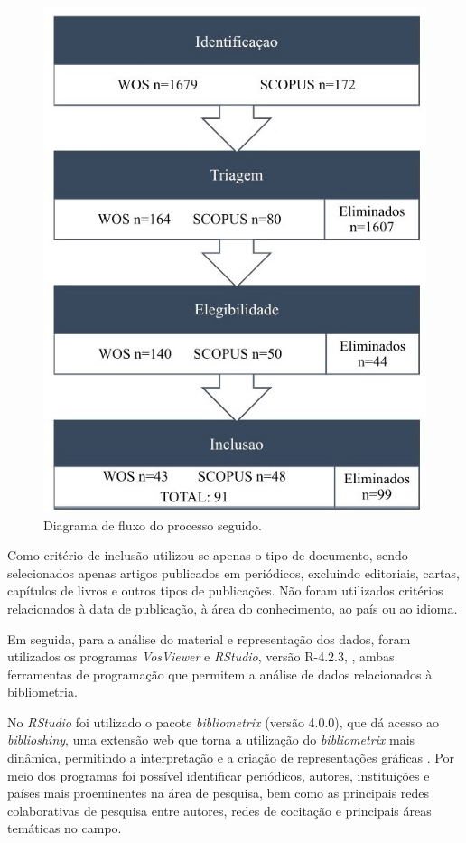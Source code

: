 \documentclass[portuguese]{textolivre}
\begin{document}
\begin{figure}[h!]
    \centering
    \includegraphics[width=0.6\linewidth]{Fig1.jpg}
    \caption{Diagrama de fluxo do processo seguido.}
    \label{fig1}
\end{figure}

Como critério de inclusão utilizou-se apenas o tipo de documento, sendo selecionados apenas artigos publicados em periódicos, excluindo editoriais, cartas, capítulos de livros e outros tipos de publicações. Não foram utilizados critérios relacionados à data de publicação, à área do conhecimento, ao país ou ao idioma.

Em seguida, para a análise do material e representação dos dados, foram utilizados os programas \textit{VosViewer} \cite{van_eck_text_2011} e \textit{RStudio}, versão R-4.2.3, \cite{r_core_team_r:_2016}, ambas ferramentas de programação que permitem a análise de dados relacionados à bibliometria.

No \textit{RStudio} foi utilizado o pacote \textit{bibliometrix} (versão 4.0.0), que dá acesso ao \textit{biblioshiny}, uma extensão web que torna a utilização do \textit{bibliometrix} mais dinâmica, permitindo a interpretação e a criação de representações gráficas \cite{aria_bibliometrix_2017}. Por meio dos programas foi possível identificar periódicos, autores, instituições e países mais proeminentes na área de pesquisa, bem como as principais redes colaborativas de pesquisa entre autores, redes de cocitação e principais áreas temáticas no campo.
\end{document}
